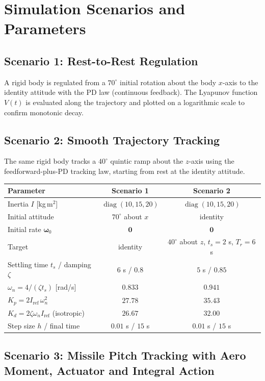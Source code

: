 \documentclass[11pt, a4paper]{article}
\newcommand{\vect}[1]{\boldsymbol{#1}}
\newcommand{\w}{\vect{\omega}}
\newcommand{\diag}{\operatorname{diag}}
\begin{document}
\section{Simulation Scenarios and Parameters}

\subsection{Scenario 1: Rest-to-Rest Regulation}
A rigid body is regulated from a $70^\circ$ initial rotation about the body $x$-axis to the identity attitude with the PD law (continuous feedback). The Lyapunov function $V(t)$ is evaluated along the trajectory and plotted on a logarithmic scale to confirm monotonic decay.

\subsection{Scenario 2: Smooth Trajectory Tracking}
The same rigid body tracks a $40^\circ$ quintic ramp about the $z$-axis using the feedforward-plus-PD tracking law, starting from rest at the identity attitude.

\begin{center}
\begin{tabular}{lcc}
\toprule
\textbf{Parameter} & \textbf{Scenario 1} & \textbf{Scenario 2} \\
\midrule
Inertia $I$ [kg\,m$^2$] & $\diag(10, 15, 20)$ & $\diag(10, 15, 20)$ \\
Initial attitude & $70^\circ$ about $x$ & identity \\
Initial rate $\w_0$ & $\vect{0}$ & $\vect{0}$ \\
Target & identity & $40^\circ$ about $z$, $t_s = 2$ s, $T_r = 6$ s \\
Settling time $t_s$ / damping $\zeta$ & $6$ s / $0.8$ & $5$ s / $0.85$ \\
$\omega_n = 4 / (\zeta t_s)$ [rad/s] & $0.833$ & $0.941$ \\
$K_p = 2 I_{\text{ref}}\, \omega_n^2$ & $27.78$ & $35.43$ \\
$K_d = 2 \zeta \omega_n I_{\text{ref}}$ (isotropic) & $26.67$ & $32.00$ \\
Step size $h$ / final time & $0.01$ s / $15$ s & $0.01$ s / $15$ s \\
\bottomrule
\end{tabular}
\end{center}

\subsection{Scenario 3: Missile Pitch Tracking with Aero Moment, Actuator and Integral Action}
\end{document}
